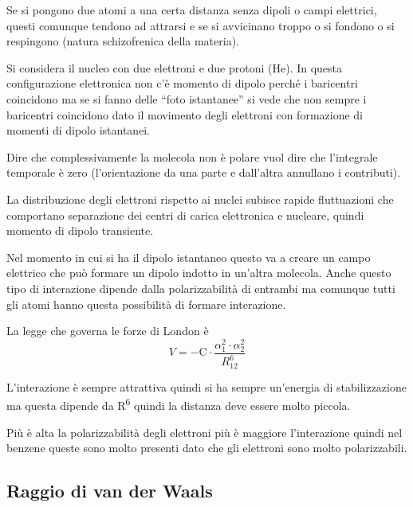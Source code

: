 Se si pongono due atomi a una certa distanza senza dipoli o campi
elettrici, questi comunque tendono ad attrarsi e se si avvicinano troppo
o si fondono o si respingono (natura schizofrenica della materia).

Si considera il nucleo con due elettroni e due protoni (He).
In questa configurazione elettronica non c'è momento di dipolo perché i
baricentri coincidono ma se si fanno delle ``foto istantanee'' si vede
che non sempre i baricentri coincidono dato il movimento degli elettroni
con formazione di momenti di dipolo istantanei.

Dire che complessivamente la molecola non è polare vuol dire che
l'integrale temporale è zero (l'orientazione da una parte e dall'altra
annullano i contributi).

La distribuzione degli elettroni rispetto ai nuclei subisce rapide
fluttuazioni che comportano separazione dei centri di carica elettronica
e nucleare, quindi momento di dipolo transiente.

Nel momento in cui si ha il dipolo istantaneo questo va a creare un
campo elettrico che può formare un dipolo indotto in un'altra molecola.
Anche questo tipo di interazione dipende dalla polarizzabilità di
entrambi ma comunque tutti gli atomi hanno questa possibilità di formare
interazione.



La legge che governa le forze di London è
\[
  V = -\text{C} \cdot \frac{\alpha_1^2 \cdot \alpha_2^2}{R_{12}^6}
\]

L'interazione
è sempre attrattiva quindi si ha sempre un'energia di stabilizzazione ma
questa dipende da R\textsuperscript{6} quindi la distanza deve essere
molto piccola.


Più è alta la polarizzabilità degli elettroni più è maggiore
l'interazione quindi nel benzene queste sono molto presenti dato che gli
elettroni sono molto polarizzabili.


\subsection{Raggio di van der Waals}


